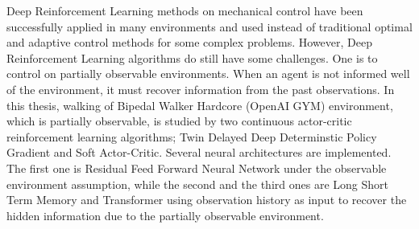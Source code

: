 Deep Reinforcement Learning methods on mechanical control have been successfully applied in many environments and used instead of traditional optimal and adaptive control methods for some complex problems. 
However, Deep Reinforcement Learning algorithms do still have some challenges. 
One is to control on partially observable environments. 
When an agent is not informed well of the environment, it must recover information from the past observations. 
In this thesis, walking of Bipedal Walker Hardcore (OpenAI GYM) environment, 
which is partially observable, 
is studied by two continuous actor-critic reinforcement learning algorithms; Twin Delayed Deep Determinstic Policy Gradient and Soft Actor-Critic.
Several neural architectures are implemented. 
The first one is Residual Feed Forward Neural Network under the observable environment assumption, 
while the second and the third ones are Long Short Term Memory and Transformer using observation history as input to recover the hidden information due to the partially observable environment. 
